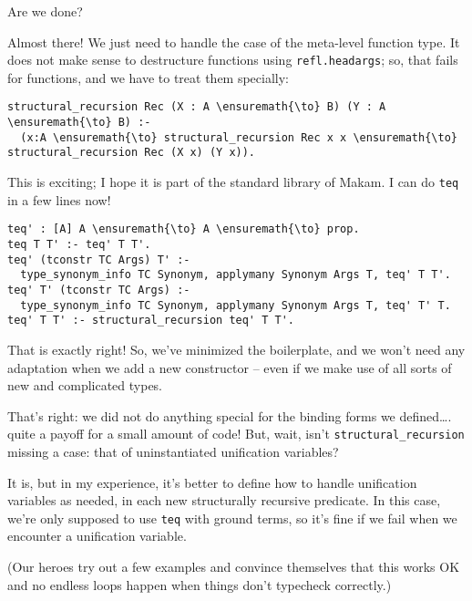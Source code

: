 \heroSTUDENT{} Are we done?

\heroADVISOR{} Almost there! We just need to handle the case of the meta-level
function type. It does not make sense to destructure functions using
\texttt{refl.headargs}; so, that fails for functions, and we have to
treat them specially:

\begin{verbatim}
structural_recursion Rec (X : A \ensuremath{\to} B) (Y : A \ensuremath{\to} B) :-
  (x:A \ensuremath{\to} structural_recursion Rec x x \ensuremath{\to} structural_recursion Rec (X x) (Y x)).
\end{verbatim}

\heroSTUDENT{} This is exciting; I hope it is part of the standard library of
Makam. I can do \texttt{teq} in a few lines now!

\begin{verbatim}
teq' : [A] A \ensuremath{\to} A \ensuremath{\to} prop.
teq T T' :- teq' T T'.
teq' (tconstr TC Args) T' :-
  type_synonym_info TC Synonym, applymany Synonym Args T, teq' T T'.
teq' T' (tconstr TC Args) :-
  type_synonym_info TC Synonym, applymany Synonym Args T, teq' T' T.
teq' T T' :- structural_recursion teq' T T'.
\end{verbatim}

\heroADVISOR{} That is exactly right! So, we've minimized the boilerplate, and
we won't need any adaptation when we add a new constructor -- even if we
make use of all sorts of new and complicated types.

\heroSTUDENT{} That's right: we did not do anything special for the binding
forms we defined\ldots{}. quite a payoff for a small amount of code!
But, wait, isn't \texttt{structural\_recursion} missing a case: that of
uninstantiated unification variables?

\heroADVISOR{} It is, but in my experience, it's better to define how to
handle unification variables as needed, in each new structurally
recursive predicate. In this case, we're only supposed to use
\texttt{teq} with ground terms, so it's fine if we fail when we
encounter a unification variable.

\begin{scenecomment}
(Our heroes try out a few examples and convince themselves that this works OK and no endless loops happen when things don't typecheck correctly.)
\end{scenecomment}
